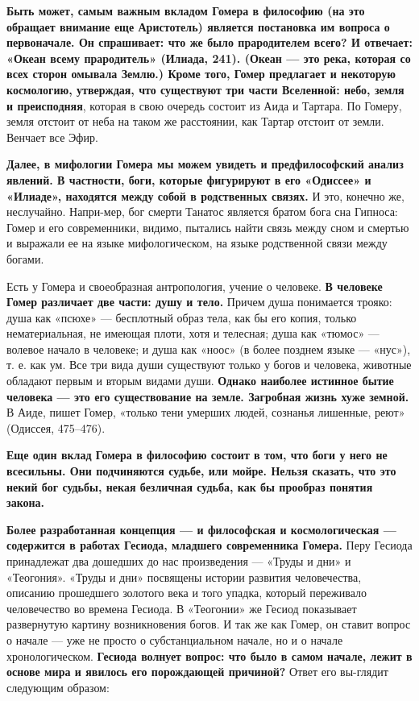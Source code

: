     \par \textbf{Быть может, самым важным вкладом Гомера в философию (на это обращает 
	внимание еще 
	Аристотель) является постановка им вопроса о первоначале. Он спрашивает: что же было 
	прародителем всего? И отвечает: «Океан всему прародитель» (Илиада, 241). (Океан — 
	это река, которая со всех сторон омывала Землю.) Кроме того, Гомер предлагает и 
	некоторую космологию, утверждая, что существуют три части Вселенной: небо, земля и 
	преисподняя}, которая в свою очередь состоит из Аида и Тартара. По Гомеру, земля отстоит 
	от неба на таком же расстоянии, как Тартар отстоит от земли. Венчает все Эфир.
    
    \par \textbf{Далее, в мифологии Гомера мы можем увидеть и предфилософский анализ явлений. 
	В частности, боги, которые фигурируют в его «Одиссее» и «Илиаде», находятся между 
	собой в родственных связях.} И это, конечно же, неслучайно. Напри-мер, бог смерти 
	Танатос является братом бога сна Гипноса: Гомер и его современники, видимо, пытались 
	найти связь между сном и смертью и выражали ее на языке мифологическом, на языке 
	родственной связи между богами.
    
    \par Есть у Гомера и своеобразная антропология, учение о человеке. \textbf{В человеке 
	Гомер различает две части: душу и тело.} Причем душа понимается трояко: душа как 
	«псюхе» — бесплотный образ тела, как бы его копия, только нематериальная, не имеющая 
	плоти, хотя и телесная; душа как «тюмос» — волевое начало в человеке; и душа как «ноос» 
	(в более позднем языке — «нус»), т. е. как ум. Все три вида души существуют только 
	у богов и человека, животные обладают первым и вторым видами души. \textbf{Однако наиболее
	истинное бытие человека — это его существование на земле. Загробная жизнь хуже земной.} 
	В Аиде, пишет Гомер, «только тени умерших людей, сознанья лишенные, реют» (Одиссея, 
	475–476). 
    
    \par \textbf{Еще один вклад Гомера в философию состоит в том, что боги у него не всесильны. 
	Они подчиняются судьбе, или мойре. Нельзя сказать, что это некий бог судьбы, некая 
	безличная судьба, как бы прообраз понятия закона.}
    
    \par \textbf{Более разработанная концепция — и философская и космологическая — содержится в 
	работах Гесиода, младшего современника Гомера.} Перу Гесиода принадлежат два дошедших 
	до нас произведения — «Труды и дни» и «Теогония». «Труды и дни» посвящены истории 
	развития человечества, описанию прошедшего золотого века и того упадка, который 
	переживало человечество во времена Гесиода. В «Теогонии» же Гесиод показывает развернутую 
	картину возникновения богов. И так же как Гомер, он ставит вопрос о начале — уже не 
	просто о субстанциальном начале, но и о начале хронологическом. \textbf{Гесиода волнует вопрос: 
	что было в самом начале, лежит в основе мира и явилось его порождающей причиной?}
	Ответ его вы-глядит следующим образом: 
    \\
    

